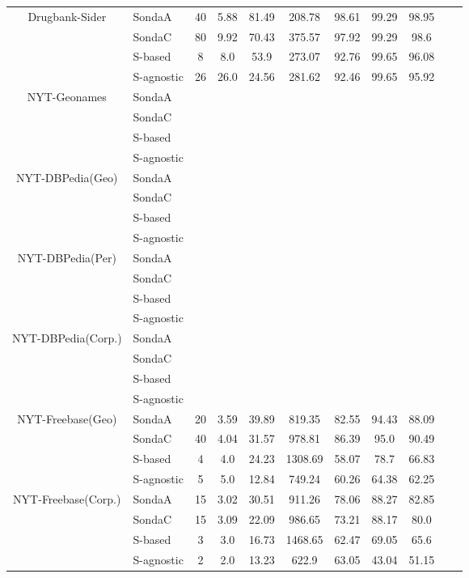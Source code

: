 \begin{center}
\begin{table*}[h]
\begin{tabular}{|c|l|c|c|c|c|c|c|c|c|c|}
\multirow{4}{*}{Drugbank-Sider} & SondaA    & 40 & 5.88   & 81.49  & 208.78    & 98.61 & 99.29 & 98.95 \\
											& SondaC	   & 80 & 9.92   & 70.43  & 375.57  & 97.92 & 99.29 & 98.6 \\
											& S-based     & 8 & 8.0   & 53.9  & 273.07  & 92.76 & 99.65 & 96.08\\
 											& S-agnostic   & 26 & 26.0   & 24.56  & 281.62   & 92.46 & 99.65 & 95.92 \\ \hline 											 

\multirow{4}{*}{NYT-Geonames} & SondaA   \\
											& SondaC  \\
											& S-based    \\
 											& S-agnostic     \\ \hline 											


\multirow{4}{*}{NYT-DBPedia(Geo)} & SondaA    \\
											& SondaC  \\
											& S-based \\
 											& S-agnostic       \\ \hline 											
 		
\multirow{4}{*}{NYT-DBPedia(Per)} & SondaA   \\
											& SondaC  \\
											& S-based  \\
 											& S-agnostic       \\ \hline 			
 																			
\multirow{4}{*}{NYT-DBPedia(Corp.)} & SondaA   \\
											& SondaC  \\
											& S-based  \\
 											& S-agnostic       \\ \hline 		 		
 		
\multirow{4}{*}{NYT-Freebase(Geo)} & SondaA  & 20 & 3.59   & 39.89  & 819.35     & 82.55 & 94.43 & 88.09 \\
											& SondaC    & 40 & 4.04   & 31.57  & 978.81   & 86.39 & 95.0 & 90.49\\
											& S-based     & 4 & 4.0   & 24.23  & 1308.69   & 58.07 & 78.7 & 66.83\\
 											& S-agnostic    & 5 & 5.0   & 12.84  & 749.24    & 60.26 & 64.38 & 62.25   \\ \hline 											
 

\multirow{4}{*}{NYT-Freebase(Corp.)} & SondaA   & 15 & 3.02   & 30.51  & 911.26  & 78.06 & 88.27 & 82.85   \\
											 & SondaC   & 15 & 3.09   & 22.09  & 986.65  & 73.21 & 88.17 & 80.0\\
											& S-based     & 3 & 3.0   & 16.73  & 1468.65   & 62.47 & 69.05 & 65.6\\
 											& S-agnostic   & 2 & 2.0   & 13.23  & 622.9       & 63.05 & 43.04 & 51.15    \\ \hline 					
 											

\end{tabular}
\end{table*}
\end{center}
